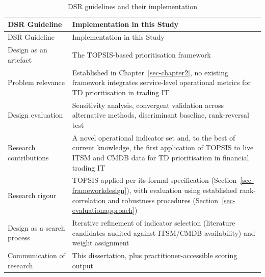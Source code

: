 \documentclass[
  12pt,
  letterpaper,
  12pt,
  oneside,
  english,
  onehalfspacing,
  headsepline]{MastersDoctoralThesis}
\begin{document}
\begin{samepage}
\scriptsize

\begin{longtable}[]{@{}
  >{\raggedright\arraybackslash}p{}
  >{\raggedright\arraybackslash}p{}@{}}
\caption{DSR guidelines and their
implementation}\label{tbl-dsr-guidelines}\tabularnewline
\toprule\noalign{}
\begin{minipage}[b]{\linewidth}\raggedright
DSR Guideline
\end{minipage} & \begin{minipage}[b]{\linewidth}\raggedright
Implementation in this Study
\end{minipage} \\
\midrule\noalign{}
\endfirsthead
\toprule\noalign{}
\begin{minipage}[b]{\linewidth}\raggedright
DSR Guideline
\end{minipage} & \begin{minipage}[b]{\linewidth}\raggedright
Implementation in this Study
\end{minipage} \\
\midrule\noalign{}
\endhead
\bottomrule\noalign{}
\endlastfoot
Design as an artefact & The TOPSIS-based prioritisation framework \\
Problem relevance & Established in Chapter~\ref{sec-chapter2}, no
existing framework integrates service-level operational metrics for TD
prioritisation in trading IT \\
Design evaluation & Sensitivity analysis, convergent validation across
alternative methods, discriminant baseline, rank-reversal test \\
Research contributions & A novel operational indicator set and, to the
best of current knowledge, the first application of TOPSIS to live ITSM
and CMDB data for TD prioritisation in financial trading IT \\
Research rigour & TOPSIS applied per its formal specification
(Section~\ref{sec-frameworkdesign}), with evaluation using established
rank-correlation and robustness procedures
(Section~\ref{sec-evaluationapproach}) \\
Design as a search process & Iterative refinement of indicator selection
(literature candidates audited against ITSM/CMDB availability) and
weight assignment \\
Communication of research & This dissertation, plus
practitioner-accessible scoring output \\
\end{longtable}

\end{samepage}
\end{document}
